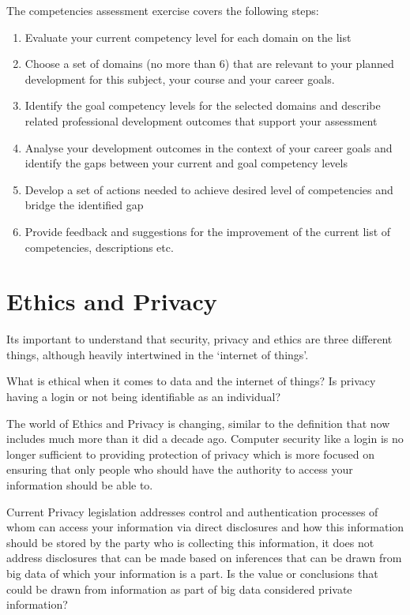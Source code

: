 \documentclass[]{book}
\providecommand{\tightlist}{%
  \setlength{\itemsep}{0pt}\setlength{\parskip}{0pt}}
\theoremstyle{definition}
\theoremstyle{definition}
\theoremstyle{remark}
\begin{document}
The competencies assessment exercise covers the following steps:

\begin{enumerate}
\def\labelenumi{\arabic{enumi}.}
\tightlist
\item
  Evaluate your current competency level for each domain on the list
\item
  Choose a set of domains (no more than 6) that are relevant to your
  planned development for this subject, your course and your career
  goals.
\item
  Identify the goal competency levels for the selected domains and
  describe related professional development outcomes that support your
  assessment
\item
  Analyse your development outcomes in the context of your career goals
  and identify the gaps between your current and goal competency levels
\item
  Develop a set of actions needed to achieve desired level of
  competencies and bridge the identified gap
\item
  Provide feedback and suggestions for the improvement of the current
  list of competencies, descriptions etc.
\end{enumerate}

\section{Ethics and Privacy}\label{ethics-and-privacy}

Its important to understand that security, privacy and ethics are three
different things, although heavily intertwined in the `internet of
things'.

What is ethical when it comes to data and the internet of things? Is
privacy having a login or not being identifiable as an individual?

The world of Ethics and Privacy is changing, similar to the definition
that now includes much more than it did a decade ago. Computer security
like a login is no longer sufficient to providing protection of privacy
which is more focused on ensuring that only people who should have the
authority to access your information should be able to.

Current Privacy legislation addresses control and authentication
processes of whom can access your information via direct disclosures and
how this information should be stored by the party who is collecting
this information, it does not address disclosures that can be made based
on inferences that can be drawn from big data of which your information
is a part. Is the value or conclusions that could be drawn from
information as part of big data considered private information?
\end{document}

